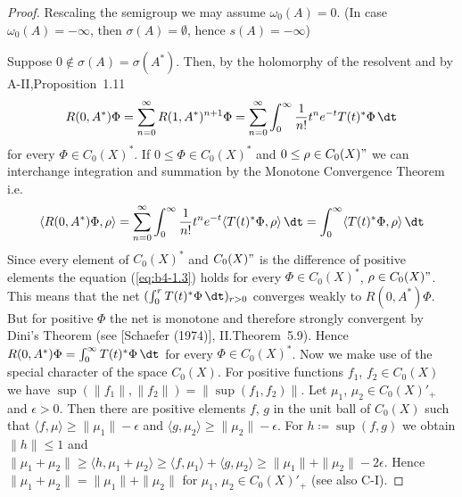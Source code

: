 \begin{proof}
Rescaling the semigroup we may assume $\omega_{0}(A) = 0$. (In case $\omega_{0}(A) = -\infty$, then $\sigma(A) = \emptyset$, hence $s(A) = -\infty$)

Suppose $0 \notin \sigma(A) = \sigma(A^*)$. Then, by the holomorphy of the resolvent and by A-II,Proposition~1.11
\[
   R(0,A^*)\Phi = \sum_{n=0}^{\infty} R(1,A^*)^{n+1}\Phi = \sum_{n=0}^{\infty} \int_0^{\infty} \frac{1}{n!} t^n e^{-t}T(t)^*\Phi \, \dt
\]  
 for every  $\Phi \in C_{0}(X)^*$. If $0 \leq \Phi \in C_{0}(X)^*$ and $0 \leq \rho \in C_{0}(X)"$ we can interchange integration and summation by the Monotone Convergence Theorem i.e.
\begin{equation}\label{eq:b4-1.3}
   \langle R(0,A^*)\Phi,\rho \rangle = \sum_{n=0}^{\infty} \int_0^{\infty} \frac{1}{n!} t^n e^{-t}\langle T(t)^*\Phi,\rho \rangle \, \dt = \int_0^{\infty} \langle T(t)^*\Phi,\rho \rangle \, \dt
\end{equation}
Since every element of $C_{0}(X)^*$ and $C_{0}(X)"$ is the difference of positive
%
%
%
\newpage
elements the equation (\ref{eq:b4-1.3}) holds for every $\Phi \in C_{0}(X)^*$, $\rho \in C_{0}(X)"$. 
This means that the net $(\int_0^r T(t)^*\Phi \, \dt)_{r > 0}$ converges weakly to $R(0,A^*)\Phi$. 
But for positive $\Phi$ the net is monotone and therefore strongly convergent by Dini's Theorem (see [Schaefer (1974)], II.Theorem~5.9). Hence $R(0,A^*)\Phi = \int_0^{\infty} T(t)^*\Phi \, \dt$ for every $\Phi \in C_{0}(X)^*$.
Now we make use of the special character of the space $C_{0}(X)$. For positive functions $f_1$, $f_2 \in C_{0}(X)$ we have $\sup(\|f_1\|,\|f_2\|) = \|\sup(f_1,f_2)\|$. Let $\mu_1$, $\mu_2 \in C_{0}(X)'_+$ and $\epsilon  >  0$. Then there are positive elements $f$, $g$ in the unit ball of $C_{0}(X)$ such that $\langle f,\mu \rangle \geq \|\mu_1\| - \epsilon$ and $\langle g,\mu_2 \rangle \geq \|\mu_2\| - \epsilon$. For $h \coloneq \sup(f,g)$ we obtain $\|h\| \leq 1$ and $\|\mu_1 + \mu_2\| \geq \langle h,\mu_1 + \mu_2 \rangle \geq \langle f,\mu_1 \rangle + \langle g,\mu_2 \rangle \geq \|\mu_1\| + \|\mu_2\| - 2\epsilon$.
Hence $\|\mu_1 + \mu_2\| = \|\mu_1\| + \|\mu_2\|$ for $\mu_1$, $\mu_2 \in C_{0}(X)'_+$ (see also C-I).


\end{proof}
